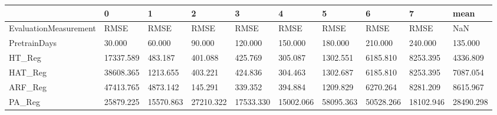 \begin{tabular}{llllllllll}
\toprule
{} &         0 &         1 &         2 &         3 &         4 &         5 &         6 &         7 &      mean \\
\midrule
EvaluationMeasurement &      RMSE &      RMSE &      RMSE &      RMSE &      RMSE &      RMSE &      RMSE &      RMSE &       NaN \\
PretrainDays          &    30.000 &    60.000 &    90.000 &   120.000 &   150.000 &   180.000 &   210.000 &   240.000 &   135.000 \\
HT\_Reg                & 17337.589 &   483.187 &   401.088 &   425.769 &   305.087 &  1302.551 &  6185.810 &  8253.395 &  4336.809 \\
HAT\_Reg               & 38608.365 &  1213.655 &   403.221 &   424.836 &   304.463 &  1302.687 &  6185.810 &  8253.395 &  7087.054 \\
ARF\_Reg               & 47413.765 &  4873.142 &   145.291 &   339.352 &   394.884 &  1209.829 &  6270.264 &  8281.209 &  8615.967 \\
PA\_Reg                & 25879.225 & 15570.863 & 27210.322 & 17533.330 & 15002.066 & 58095.363 & 50528.266 & 18102.946 & 28490.298 \\
\bottomrule
\end{tabular}
